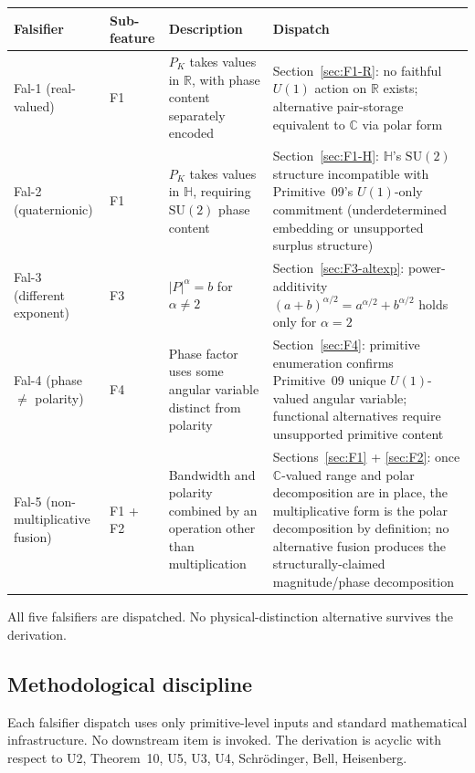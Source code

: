 \documentclass[11pt,a4paper]{article}
\begin{document}
\begin{center}
\begin{tabular}{p{2.0cm}p{1.2cm}p{4.5cm}p{6.0cm}}
\hline
Falsifier & Sub-feature & Description & Dispatch \\
\hline
Fal-1 (real-valued) & F1 & $P_K$ takes values in $\mathbb{R}$, with phase content separately encoded & Section~\ref{sec:F1-R}: no faithful $U(1)$ action on $\mathbb{R}$ exists; alternative pair-storage equivalent to $\mathbb{C}$ via polar form \\
Fal-2 (quaternionic) & F1 & $P_K$ takes values in $\mathbb{H}$, requiring $\mathrm{SU}(2)$ phase content & Section~\ref{sec:F1-H}: $\mathbb{H}$'s $\mathrm{SU}(2)$ structure incompatible with Primitive~09's $U(1)$-only commitment (underdetermined embedding or unsupported surplus structure) \\
Fal-3 (different exponent) & F3 & $|P|^\alpha = b$ for $\alpha \neq 2$ & Section~\ref{sec:F3-altexp}: power-additivity $(a+b)^{\alpha/2} = a^{\alpha/2} + b^{\alpha/2}$ holds only for $\alpha = 2$ \\
Fal-4 (phase $\neq$ polarity) & F4 & Phase factor uses some angular variable distinct from polarity & Section~\ref{sec:F4}: primitive enumeration confirms Primitive~09 unique $U(1)$-valued angular variable; functional alternatives require unsupported primitive content \\
Fal-5 (non-multiplicative fusion) & F1 + F2 & Bandwidth and polarity combined by an operation other than multiplication & Sections~\ref{sec:F1} + \ref{sec:F2}: once $\mathbb{C}$-valued range and polar decomposition are in place, the multiplicative form is the polar decomposition by definition; no alternative fusion produces the structurally-claimed magnitude/phase decomposition \\
\hline
\end{tabular}
\end{center}

All five falsifiers are dispatched. No physical-distinction alternative survives the derivation.

\subsection{Methodological discipline}

Each falsifier dispatch uses only primitive-level inputs and standard mathematical infrastructure. No downstream item is invoked. The derivation is acyclic with respect to U2, Theorem~10, U5, U3, U4, Schr\"odinger, Bell, Heisenberg.
\end{document}
